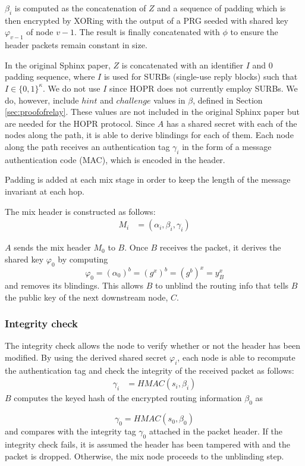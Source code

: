 $\beta_i$ is computed as the concatenation of $Z$ and a sequence of padding which is then encrypted by XORing with the output of a PRG seeded with shared key $\varphi_{v-1}$ of node $v-1$. The result is finally concatenated with $\phi$ to ensure the header packets remain constant in size.
    
In the original Sphinx paper, $Z$ is concatenated with an identifier $I$
    and $0$ padding sequence, where $I$ is used for SURBs (single-use reply
    blocks) such that $I \in \{0, 1\}^\kappa$. We do not use $I$ since HOPR does not
    currently employ SURBs. We do, however, include $hint$ and $challenge$ values in
    $\beta$, defined in Section \ref{sec:proofofrelay}. These values are not included in the original Sphinx paper but are needed for the HOPR protocol.
    Since $A$ has a shared secret with each of the nodes along the path, it is able to derive blindings for each of them.
    Each node along the path receives an authentication tag $\gamma_i$ in the form of a message authentication code (MAC),
which is encoded in the header.

Padding is added at each mix stage in order to keep the length of the message invariant at each hop.

The mix header is constructed as follows: 
\begin{align}  
    M_i&=(\alpha_i,\beta_i,\gamma_i)
\end{align}

$A$ sends the mix header $M_0$ to $B$. Once $B$ receives the packet, it derives the shared key $\varphi_0$ by computing $$\varphi_0=(\alpha_0)^b=(g^x)^b=(g^b)^x=y^x_B$$
and removes its blindings. This allows $B$ to unblind the routing info that tells $B$ the public key of the next downstream node, $C$.

\subsubsection{Integrity check}
The integrity check allows the node to verify whether or not the header has been modified. By using the derived shared secret $\varphi_i$, each node is able to recompute the authentication tag and check the integrity of the received packet as follows: 
\begin{align}  
    \gamma_i&=HMAC(s_i,\beta_i)
    \label{eq:6}
\end{align}
$B$ computes the keyed hash of the encrypted routing information $\beta_0$ as

    $$\gamma_0=HMAC(s_0,\beta_0)$$
and compares with the integrity tag $\gamma_0$ attached in the packet header. If the integrity check fails, it is assumed the header has been tampered with and the packet is dropped. Otherwise, the mix node proceeds to the unblinding step.

